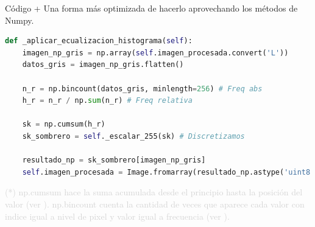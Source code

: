 \documentclass{beamer}
\begin{document}
\begin{frame}[fragile]{Código +}
	\justifying
	Una forma más optimizada de hacerlo aprovechando los métodos de Numpy.
	
	\begin{lstlisting}[language=Python]
def _aplicar_ecualizacion_histograma(self):
	imagen_np_gris = np.array(self.imagen_procesada.convert('L'))
	datos_gris = imagen_np_gris.flatten()
	
	n_r = np.bincount(datos_gris, minlength=256) # Freq abs
	h_r = n_r / np.sum(n_r) # Freq relativa
	
	sk = np.cumsum(h_r)
	sk_sombrero = self._escalar_255(sk) # Discretizamos
	
	resultado_np = sk_sombrero[imagen_np_gris]
	self.imagen_procesada = Image.fromarray(resultado_np.astype('uint8')).convert('RGB')
	\end{lstlisting}
	
	\vfill
	\footnotesize \textcolor{lightgray}{(*) np.cumsum hace la suma acumulada desde el principio hasta la posición del valor (ver \cite{numpy-cumsum}). np.bincount cuenta la cantidad de veces que aparece cada valor con indice igual a nivel de pixel y valor igual a frecuencia (ver \cite{numpy-bincount}).}
\end{frame}
\end{document}
